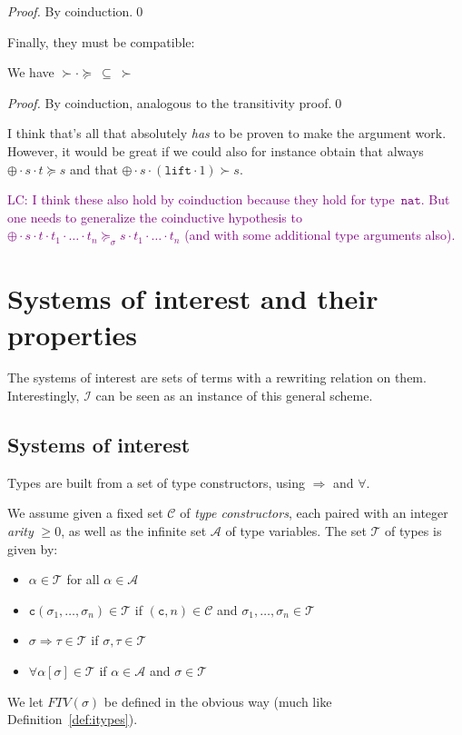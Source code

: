 \documentclass[runningheads,a4paper]{llncs}
\newcommand{\Iterms}{\mathcal{I}}
\newcommand{\Typevars}{\mathcal{A}}
\newcommand{\Types}{\mathcal{T}}
\newcommand{\TypeConstructors}{\mathcal{C}}
\newcommand{\quant}[2]{\forall #1[#2]}
\newcommand{\arrtype}{\Rightarrow}
\newcommand{\app}[2]{#1 \cdot #2}
\newcommand{\FTV}{\mathit{FTV}}
\newcommand{\nat}{\mathtt{nat}}
\newcommand{\lift}{\mathtt{lift}}
\newcommand{\con}{\mathtt{c}}
\newcommand{\LC}[1]{\textcolor{purple}{LC: #1}}
\begin{document}
\begin{proof}
  By coinduction.\qed
\end{proof}

Finally, they must be compatible:

\begin{lemma}
We have $\succ \cdot \succeq\ \subseteq\ \succ$
\end{lemma}

\begin{proof}
By coinduction, analogous to the transitivity proof.\qed
\end{proof}

I think that's all that absolutely \emph{has} to be proven to make the
argument work.  However, it would be great if we could also for
instance obtain that always $\app{\app{\oplus}{s}}{t} \succeq s$ and
that $\app{\app{\oplus}{s}}{(\app{\lift}{1})} \succ s$.

\LC{I think these also hold by coinduction because they hold for
type~$\nat$. But one needs to generalize the coinductive hypothesis to
$\app{\app{\oplus}{s}}{t} \cdot t_1 \cdot \ldots \cdot t_n
\succeq_\sigma s \cdot t_1 \cdot \ldots \cdot t_n$ (and with some
additional type arguments also).}

\section{Systems of interest and their properties}

The systems of interest are sets of terms with a rewriting relation on
them.  Interestingly, $\Iterms$ can be seen as an instance of this general
scheme.

\subsection{Systems of interest}

Types are built from a set of type constructors, using $\arrtype$ and
$\forall$.

\begin{definition}
We assume given a fixed set $\TypeConstructors$ of \emph{type
constructors}, each paired with an integer \emph{arity} $\geq 0$, as
well as the infinite set $\Typevars$ of type variables.  The set
$\Types$ of types is given by:
\begin{itemize}
\item $\alpha \in \Types$ for all $\alpha \in \Typevars$
\item $\con(\sigma_1,\dots,\sigma_n) \in \Types$ if $(\con,n) \in
  \TypeConstructors$ and $\sigma_1,\dots,\sigma_n \in \Types$
\item $\sigma \arrtype \tau \in \Types$ if $\sigma,\tau \in \Types$
\item $\quant{\alpha}{\sigma} \in \Types$ if $\alpha \in \Typevars$ and
  $\sigma \in \Types$
\end{itemize}
We let $\FTV(\sigma)$ be defined in the obvious way (much like
Definition~\ref{def:itypes}).
\end{definition}
\end{document}
